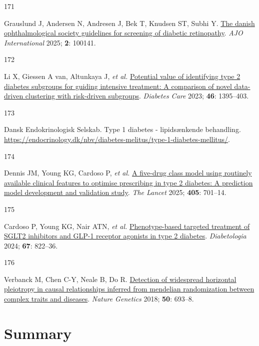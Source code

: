\documentclass[
  letterpaper,
  headsepline=true,
  open=any]{scrbook}
\newlength{\cslhangindent}
\newlength{\csllabelwidth}
\newlength{\cslentryspacingunit} %
\newenvironment{CSLReferences}[2] %
 {%
  \setlength{\parindent}{0pt}
  \ifodd #1
  \let\oldpar\par
  \def\par{\hangindent=\cslhangindent\oldpar}
  \fi
  \setlength{\parskip}{#2\cslentryspacingunit}
 }%
 {}
\newcommand{\CSLLeftMargin}[1]{\parbox[t]{\csllabelwidth}{#1}}
\newcommand{\CSLRightInline}[1]{\parbox[t]{\linewidth - \csllabelwidth}{#1}\break}
\begin{document}
\begin{CSLReferences}{0}{0}
\leavevmode{}%
\CSLLeftMargin{171 }%
\CSLRightInline{Grauslund J, Andersen N, Andresen J, Bek T, Knudsen ST,
Subhi Y. \href{https://doi.org/10.1016/j.ajoint.2025.100141}{The danish
ophthalmological society guidelines for screening of diabetic
retinopathy}. \emph{AJO International} 2025; \textbf{2}: 100141.}

\leavevmode{}%
\CSLLeftMargin{172 }%
\CSLRightInline{Li X, Giessen A van, Altunkaya J, \emph{et al.}
\href{https://doi.org/10.2337/dc22-2170}{Potential value of identifying
type 2 diabetes subgroups for guiding intensive treatment: A comparison
of novel data-driven clustering with risk-driven subgroups}.
\emph{Diabetes Care} 2023; \textbf{46}: 1395--403.}

\leavevmode{}%
\CSLLeftMargin{173 }%
\CSLRightInline{Dansk Endokrinologisk Selskab. Type 1 diabetes -
lipidsænkende behandling.
\url{https://endocrinology.dk/nbv/diabetes-melitus/type-1-diabetes-mellitus/}.}

\leavevmode{}%
\CSLLeftMargin{174 }%
\CSLRightInline{Dennis JM, Young KG, Cardoso P, \emph{et al.}
\href{https://doi.org/10.1016/S0140-6736(24)02617-5}{A five-drug class
model using routinely available clinical features to optimise
prescribing in type 2 diabetes: A prediction model development and
validation study}. \emph{The Lancet} 2025; \textbf{405}: 701--14.}

\leavevmode{}%
\CSLLeftMargin{175 }%
\CSLRightInline{Cardoso P, Young KG, Nair ATN, \emph{et al.}
\href{https://doi.org/10.1007/s00125-024-06099-3}{Phenotype-based
targeted treatment of SGLT2 inhibitors and GLP-1 receptor agonists in
type 2 diabetes}. \emph{Diabetologia} 2024; \textbf{67}: 822--36.}

\leavevmode{}%
\CSLLeftMargin{176 }%
\CSLRightInline{Verbanck M, Chen C-Y, Neale B, Do R.
\href{https://doi.org/10.1038/s41588-018-0099-7}{Detection of widespread
horizontal pleiotropy in causal relationships inferred from mendelian
randomization between complex traits and diseases}. \emph{Nature
Genetics} 2018; \textbf{50}: 693--8.}

\end{CSLReferences}


\hypertarget{summary}{%
\chapter*{Summary}\label{summary}}
\end{document}
